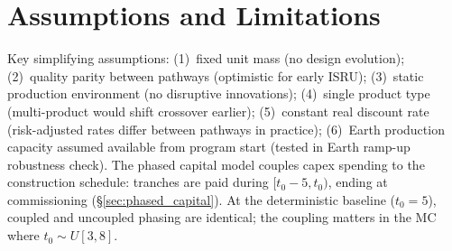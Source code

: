 \section{Assumptions and Limitations}
\label{sec:appendix_assumptions}

Key simplifying assumptions: (1)~fixed unit mass (no design evolution); (2)~quality parity between pathways (optimistic for early ISRU); (3)~static production environment (no disruptive innovations); (4)~single product type (multi-product would shift crossover earlier); (5)~constant real discount rate (risk-adjusted rates differ between pathways in practice); (6)~Earth production capacity assumed available from program start (tested in Earth ramp-up robustness check). The phased capital model couples capex spending to the construction schedule: tranches are paid during $[t_0 - 5, t_0)$, ending at commissioning (\S\ref{sec:phased_capital}). At the deterministic baseline ($t_0 = 5$), coupled and uncoupled phasing are identical; the coupling matters in the MC where $t_0 \sim U[3,8]$.

